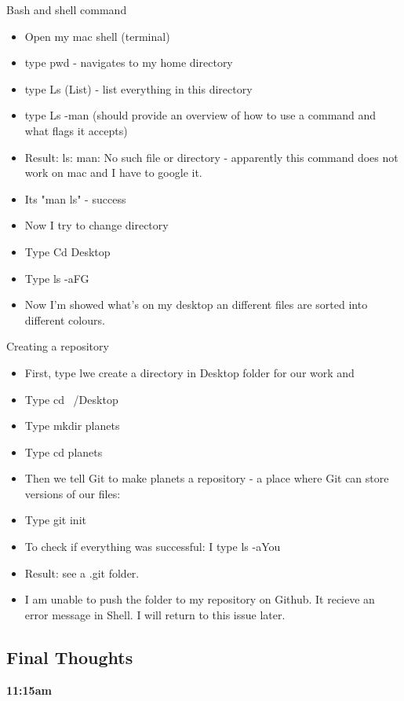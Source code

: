 \documentclass{article}
\begin{document}
Bash and shell command
\begin{itemize}
\item Open my mac shell (terminal) 
\item type pwd - navigates to my home directory
\item type Ls (List) - list everything in this directory 
\item type Ls -man (should provide an overview of how to use a command and what flags it accepts)
\item Result: ls: man: No such file or directory - apparently this command does not work on mac and I have to google it. 
\item Its "man ls" - success
\item Now I try to change directory 
\item Type Cd Desktop
\item Type ls -aFG
\item Now I'm showed what's on my desktop an different files are sorted into different colours.
\end{itemize}
Creating a repository
\begin{itemize}
    \item First, type lwe create a directory in Desktop folder for our work and 
	\item Type cd ~/Desktop
	\item Type mkdir planets
	\item Type cd planets
	\item Then we tell Git to make planets a repository - a place where Git can store versions of our files:
	\item Type git init
	\item To check if everything was successful: I type ls -aYou
	\item Result: see a .git folder.
	\item I am unable to push the folder to my repository on Github. It recieve an error message in Shell. I will return to this issue later. 
\end{itemize} 



\subsection{Final Thoughts}

\textbf{11:15am}
\end{document}
